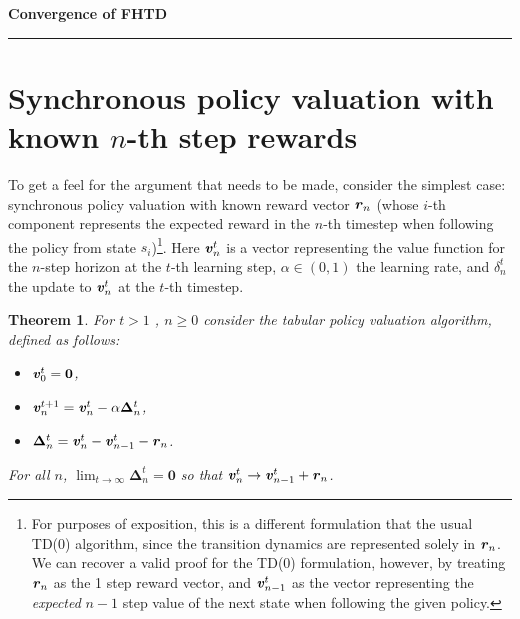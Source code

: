 \documentclass{article}
\renewcommand{\vec}[1]{\textbf{\textit{#1}}}
\newcommand{\val}{\vec{v}}
\newcommand{\valt}{\val}
\renewcommand{\r}{\textbf{\textit{r}}}
\newcommand{\dv}{\bm{\Delta}}
\newtheorem{theorem}{Theorem}
\begin{document}
{\Huge \textbf{Convergence of FHTD}}

\vspace{\baselineskip}
\hrule
\vspace{\baselineskip}

\section{Synchronous policy valuation with known $n$-th step rewards}

To get a feel for the argument that needs to be made, consider the simplest case: synchronous policy valuation with known reward vector $\r_n$ (whose $i$-th component represents the expected reward in the $n$-th timestep when following the policy from state $s_i$)\footnote{For purposes of exposition, this is a different formulation that the usual TD(0) algorithm, since the transition dynamics are represented solely in $\r_n$. We can recover a valid proof for the TD(0) formulation, however, by treating $\r_n$ as the 1 step reward vector, and $\valt_{n-1}^t$ as the vector representing the \textit{expected} $n-1$ step value of the next state when following the given policy.}. Here $\valt_n^t$ is a vector representing the value function for the $n$-step horizon at the $t$-th learning step, $\alpha \in (0, 1)$ the learning rate, and $\delta_n^t$ the update to $\valt_n^t$ at the $t$-th timestep.

\begin{theorem}
For $t > 1$ , $n \geq 0$ consider the tabular policy valuation algorithm, defined as follows:

\begin{itemize}
\item $\valt_0^t = \bm{0}$,
\item $\valt_{n}^{t+1} = \valt_{n}^{t} - \alpha\dv^t_{n}$,
\item $\dv^t_{n} = \valt^t_{n} - \valt_{n-1}^t - \r_{n}$.
\end{itemize}

For all $n$, $\lim_{t \to \infty} \dv^t_n = \bm{0}$ so that $\valt_{n}^{t} \to \valt_{n-1}^t + \r_{n}$.
\end{theorem}
\end{document}
